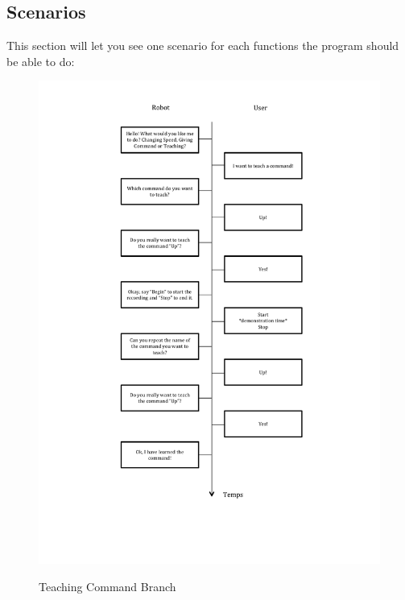 \subsection{Scenarios}
This section will let you see one scenario for each functions the program should be able to do:
\begin{figure}
\begin{center}
\includegraphics[width=16cm]{img/Schema_Dialogue_TeachingBranch.pdf}\\
\caption{Teaching Command Branch}
\end{center}
\end{figure}

